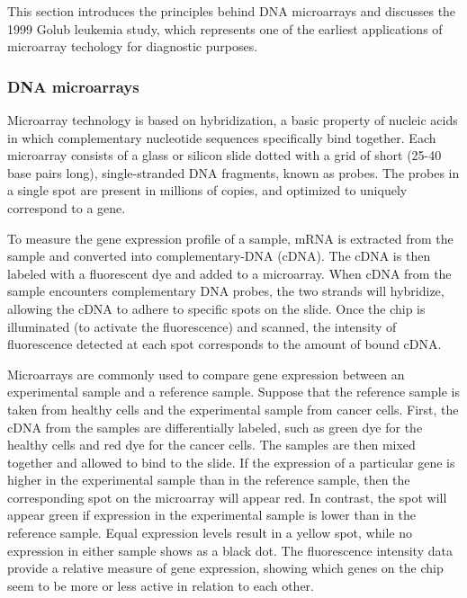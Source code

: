 This section introduces the principles behind DNA microarrays and discusses the 1999 Golub leukemia study, which represents one of the earliest applications of microarray techology for diagnostic purposes. 

\subsubsection{DNA microarrays}

Microarray technology is based on hybridization, a basic property of nucleic acids in which complementary nucleotide sequences specifically bind together. Each microarray consists of a glass or silicon slide dotted with a grid of short (25-40 base pairs long), single-stranded DNA fragments, known as probes. The probes in a single spot are present in millions of copies, and optimized to uniquely correspond to a gene. 

To measure the gene expression profile of a sample, mRNA is extracted from the sample and converted into complementary-DNA (cDNA). The cDNA is then labeled with a fluorescent dye and added to a microarray. When cDNA from the sample encounters complementary DNA probes, the two strands will hybridize, allowing the cDNA to adhere to specific spots on the slide. Once the chip is illuminated (to activate the fluorescence) and scanned, the intensity of fluorescence detected at each spot corresponds to the amount of bound cDNA.

Microarrays are commonly used to compare gene expression between an experimental sample and a reference sample. Suppose that the reference sample is taken from healthy cells and the experimental sample from cancer cells. First, the cDNA from the samples are differentially labeled, such as green dye for the healthy cells and red dye for the cancer cells. The samples are then mixed together and allowed to bind to the slide. If the expression of a particular gene is higher in the experimental sample than in the reference sample, then the corresponding spot on the microarray will appear red. In contrast, the spot will appear green if expression in the experimental sample is lower than in the reference sample. Equal expression levels result in a yellow spot, while no expression in either sample shows as a black dot. The fluorescence intensity data provide a relative measure of gene expression, showing which genes on the chip seem to be more or less active in relation to each other. 

